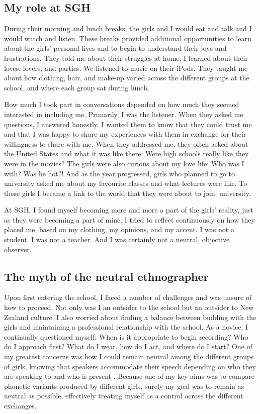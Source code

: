 \subsection{My role at SGH}

During their morning and lunch breaks, the girls and I would eat and talk and I would watch and listen. These breaks provided additional opportunities to learn about the girls' personal lives and to begin to understand their joys and frustrations. They told me about their struggles at home. I learned about their loves, lovers, and parties. We listened to music on their iPods. They taught me about how clothing, hair, and make-up varied across the different groups at the school, and where each group sat during lunch.

How much I took part in conversations depended on how much they seemed interested in including me. Primarily, I was the listener. When they asked me questions, I answered honestly. I wanted them to know that they could trust me and that I was happy to share my experiences with them in exchange for their willingness to share with me. When they addressed me, they often asked about the United States and what it was like there: Were high schools really like they were in the movies? The girls were also curious about my love life: Who was I with?  Was he hot?!  And as the year progressed, girls who planned to go to university asked me about my favourite classes and what lectures were like. To these girls I became a link to the world that they were about to join: university.

At SGH, I found myself becoming more and more a part of the girls' reality, just as they were becoming a part of mine. I tried to reflect continuously on how they placed me, based on my clothing, my opinions, and my accent. I was not a student. I was not a teacher. And I was certainly not a neutral, objective observer. 


\subsection{The myth of the neutral ethnographer}

Upon first entering the school, I faced a number of challenges and was unsure of how to proceed. Not only was I an outsider to the school but an outsider to New Zealand culture. I also worried about finding a balance between building  with the girls and maintaining a professional relationship with the school. As a novice, I continually questioned myself: When is it appropriate to begin recording?  Who do I approach first?  What do I wear, how do I act, and where do I start?  One of my greatest concerns was how I could remain neutral among the different groups of girls, knowing that speakers accommodate their speech depending on who they are speaking to and who is present \citep{gilespowesland1975,bell1984,gilesetal1991}. Because one of my key aims was to compare phonetic variants produced by different girls, surely my goal was to remain as neutral as possible, effectively treating myself as a control across the different exchanges. 

